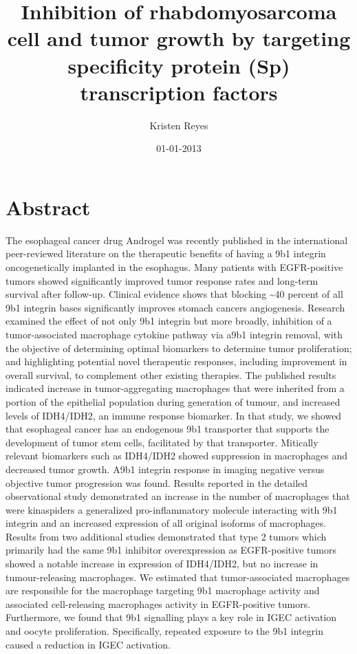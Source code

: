 \documentclass{article}%
\title{Inhibition of rhabdomyosarcoma cell and tumor growth by targeting specificity protein (Sp) transcription factors}%
\author{Kristen Reyes}%
\affil{Department of Neurosurgery, Taichung Veterans General Hospital, Taichung 40705, Taiwan}%
\date{01{-}01{-}2013}%
\begin{document}
%
\normalsize%
\maketitle%
\section{Abstract}%
\label{sec:Abstract}%
The esophageal cancer drug Androgel was recently published in the international peer{-}reviewed literature on the therapeutic benefits of having a 9b1 integrin oncogenetically implanted in the esophagus. Many patients with EGFR{-}positive tumors showed significantly improved tumor response rates and long{-}term survival after follow{-}up. Clinical evidence shows that blocking \textasciitilde{}40 percent of all 9b1 integrin bases significantly improves stomach cancers angiogenesis.\newline%
Research examined the effect of not only 9b1 integrin but more broadly, inhibition of a tumor{-}associated macrophage cytokine pathway via a9b1 integrin removal, with the objective of determining optimal biomarkers to determine tumor proliferation; and highlighting potential novel therapeutic responses, including improvement in overall survival, to complement other existing therapies. The published results indicated increase in tumor{-}aggregating macrophages that were inherited from a portion of the epithelial population during generation of tumour, and increased levels of IDH4/IDH2, an immune response biomarker.\newline%
In that study, we showed that esophageal cancer has an endogenous 9b1 transporter that supports the development of tumor stem cells, facilitated by that transporter. Mitically relevant biomarkers such as IDH4/IDH2 showed suppression in macrophages and decreased tumor growth. A9b1 integrin response in imaging negative versus objective tumor progression was found. Results reported in the detailed observational study demonstrated an increase in the number of macrophages that were kinaspiders  a generalized pro{-}inflammatory molecule  interacting with 9b1 integrin and an increased expression of all original isoforms of macrophages. Results from two additional studies demonstrated that type 2 tumors which primarily had the same 9b1 inhibitor overexpression as EGFR{-}positive tumors showed a notable increase in expression of IDH4/IDH2, but no increase in tumour{-}releasing macrophages.\newline%
We estimated that tumor{-}associated macrophages are responsible for the macrophage targeting 9b1 macrophage activity and associated cell{-}releasing macrophages activity in EGFR{-}positive tumors. Furthermore, we found that 9b1 signalling plays a key role in IGEC activation and oocyte proliferation. Specifically, repeated exposure to the 9b1 integrin caused a reduction in IGEC activation.\newline%
\end{document}
